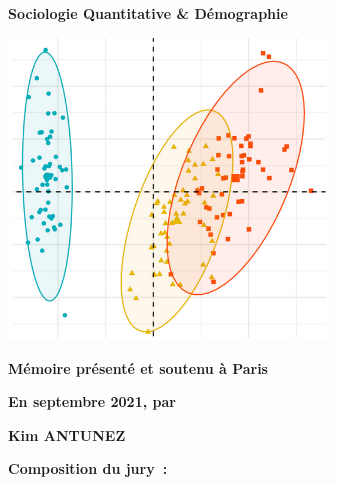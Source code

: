 \documentclass[12pt,a4paper]{reedthesis}
\begin{document}
\begin{titlepage}
\color{black}
\large
\textbf{Sociologie Quantitative \& Démographie}
\normalsize


\vspace{10mm}
\begin{center}
\includegraphics[height=8cm]{logos/accueil.png}
\end{center}
\vspace{10mm}

\textbf{Mémoire présenté et soutenu à Paris}

\medskip

\textbf{En septembre 2021, par}

\bigskip
\bigskip

\Large {\color{Prune} \textbf{Kim ANTUNEZ}}

\vspace{15mm}

\flushleft \normalsize \textbf{Composition du jury~:}
\bigskip


\end{titlepage}
\end{document}

